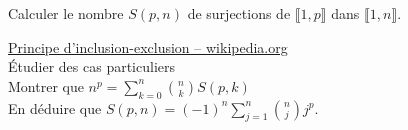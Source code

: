 \begin{exercice}
    Calculer le nombre $S(p,n)$ de surjections de $\llbracket 1, p \rrbracket$ dans $\llbracket 1, n \rrbracket$. \\
\end{exercice}


\begin{elem_sol}
    \href{https://fr.wikipedia.org/wiki/Principe_d'inclusion-exclusion}{Principe d'inclusion-exclusion -- \textsf{wikipedia.org}} \\
    Étudier des cas particuliers \\
    Montrer que $n^p = \sum\limits_{k=0}^{n} \binom{n}{k} S(p,k)$ \\
    En déduire que $S(p,n) = (-1)^n \sum\limits_{j=1}^{n} \binom{n}{j} j^p$.
\end{elem_sol}